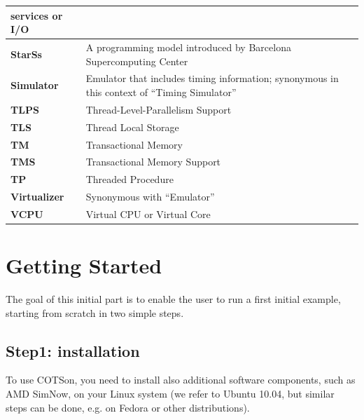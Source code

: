 \documentclass[a4paper]{article}
\begin{document}
{\begin{flushleft}
\begin{footnotesize}
\begin{supertabular}{m{1.3747599in}m{4.88586in}}
services or I/O\\\hline
\raggedleft {}\bfseries StarSs &
 A programming model introduced by Barcelona
Supercomputing Center\\\hline
\raggedleft {}\bfseries Simulator &
 Emulator that includes timing information;
synonymous in this context of {\textquotedblleft}Timing
Simulator{\textquotedblright}\\\hline
\raggedleft {}\bfseries TLPS &
 Thread-Level-Parallelism Support\\\hline
\raggedleft {}\bfseries TLS &
 Thread Local Storage\\\hline
\raggedleft {}\bfseries TM &
 Transactional Memory\\\hline
\raggedleft {}\bfseries TMS &
 Transactional Memory Support\\\hline
\raggedleft {}\bfseries TP &
 Threaded Procedure\\\hline
\raggedleft {}\bfseries Virtualizer &
 Synonymous with
{\textquotedblleft}Emulator{\textquotedblright}\\\hline
\raggedleft {}\bfseries VCPU &
 Virtual CPU or Virtual Core\\\hline
\end{supertabular}
\end{footnotesize}
\end{flushleft}

\newpage
{}

\section[Getting Started]{Getting Started}
The goal of this initial part is to enable the user to run a first
initial example, starting from scratch in two simple steps.}

\subsection[Step1: installation]{\foreignlanguage{english}{Step1:
}installation}
\label{bkm:Ref388222331}{
To use COTSon, you need to install also additional software components,
such as AMD SimNow{\texttrademark}, on your Linux system (we refer to
Ubuntu 10.04, but similar steps can be done, e.g. on Fedora or other
distributions).}
\end{document}
